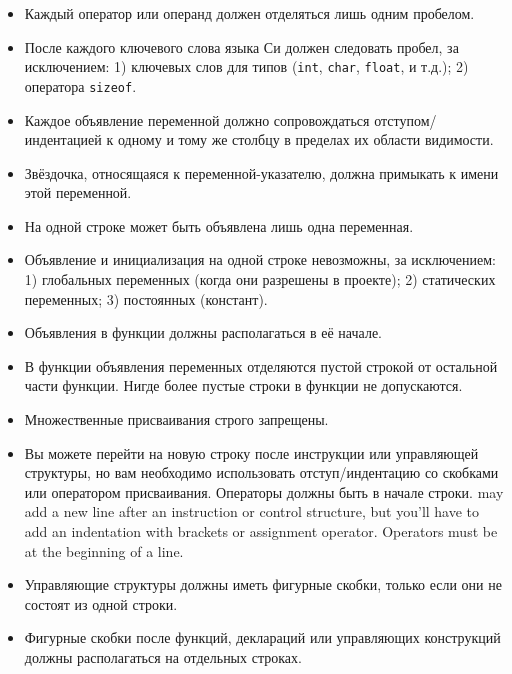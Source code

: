 \documentclass{42-ru}
\begin{document}
\begin{itemize}
                \item Каждый оператор или операнд должен отделяться лишь одним пробелом.

                \item После каждого ключевого слова языка Си должен следовать пробел, за исключением: 1) ключевых слов для типов (\texttt{int}, \texttt{char}, \texttt{float}, и т.д.); 2) оператора \texttt{sizeof}.

                \item Каждое объявление переменной должно сопровождаться отступом/индентацией к одному и тому же столбцу в пределах их области видимости.

                \item Звёздочка, относящаяся к переменной-указателю, должна примыкать к имени этой переменной.

                \item На одной строке может быть объявлена лишь одна переменная.

                \item Объявление и инициализация на одной строке невозможны, за исключением: 1) глобальных переменных (когда они разрешены в проекте); 2) статических переменных; 3) постоянных (констант).

                \item Объявления в функции должны располагаться в её начале.

                \item В функции объявления переменных отделяются пустой строкой от остальной части функции. Нигде более пустые строки в функции не допускаются.

                \item Множественные присваивания строго запрещены.

                \item Вы можете перейти на новую строку после инструкции или управляющей структуры, но вам необходимо использовать отступ/индентацию со скобками или оператором присваивания. Операторы должны быть в начале строки.
                    may add a new line after an instruction or
                  control structure, but you'll have to add an
                  indentation with brackets or assignment operator.
                  Operators must be at the beginning of a line.

                \item Управляющие структуры должны иметь фигурные скобки, только если они не состоят из одной строки.

                \item Фигурные скобки после функций, деклараций или управляющих конструкций должны располагаться на отдельных строках.

            \end{itemize}
\end{document}
